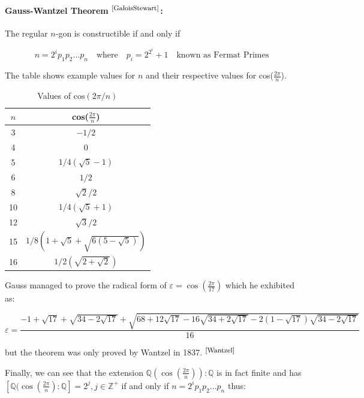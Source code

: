 \documentclass{article}
\begin{document}
\paragraph{Gauss-Wantzel Theorem $^{\textrm{\footnotesize\cite{GaloisStewart}}}$:} The regular $n$-gon is constructible if and only if

$$n = 2^i p_1 p_2 ... p_n \quad \textrm{where} \quad p_i = 2^{2^i}+1 \quad \textrm{known as Fermat Primes} \quad$$

\par
The table shows example values for $n$ and their respective values for cos($\frac{2\pi}{n}$).
\begin{table}
    \centering
    \begin{tabular}{ |c|c| } 
        \hline
         $n$& cos($\frac{2\pi}{n}$)\\
         \hline
         3& $-1/2$\\
         \hline
         4& 0\\
         \hline
         5& $1/4(\sqrt{5} - 1)$ \\
         \hline
         6& $1/2$ \\
         \hline
         8& $\sqrt{2}/2$\\
         \hline
         10& $1/4(\sqrt{5} + 1)$ \\
         \hline
         12& $\sqrt{3}/2$\\
         \hline
         15& $1/8(1+\sqrt{5} + \sqrt{6(5-\sqrt{5})})$\\
         \hline
         16& $1/2 (\sqrt{2 + \sqrt{2}})$ \\
         \hline
    \end{tabular}
    \caption{Values of $\text{cos}(2\pi/n)$}
    
\end{table}


\par 
Gauss managed to prove the radical form of $\varepsilon = \cos(\frac{2\pi}{17})$ which he exhibited as:

$$\varepsilon = \dfrac {-1+\sqrt{17}+\sqrt{34-2\sqrt{17}}+\sqrt{68+12\sqrt{17}-16\sqrt{34+2\sqrt{17}}-2(1-\sqrt{17})\sqrt{34-2\sqrt{17}}}}{16}$$

but the theorem was only proved by Wantzel in 1837. $^{\textrm{\footnotesize\cite{Wantzel}}}$


\par
Finally, we can see that the extension $\mathbb{Q}(\cos(\frac{2\pi}{n})) : \mathbb{Q}$ is in fact finite and has $[\mathbb{Q}(\cos(\frac{2\pi}{n}) : \mathbb{Q}] = 2^j,j\in\mathbb{Z}^+$ if and only if $n = 2^i p_1 p_2 ... p_n$ thus:
\end{document}
